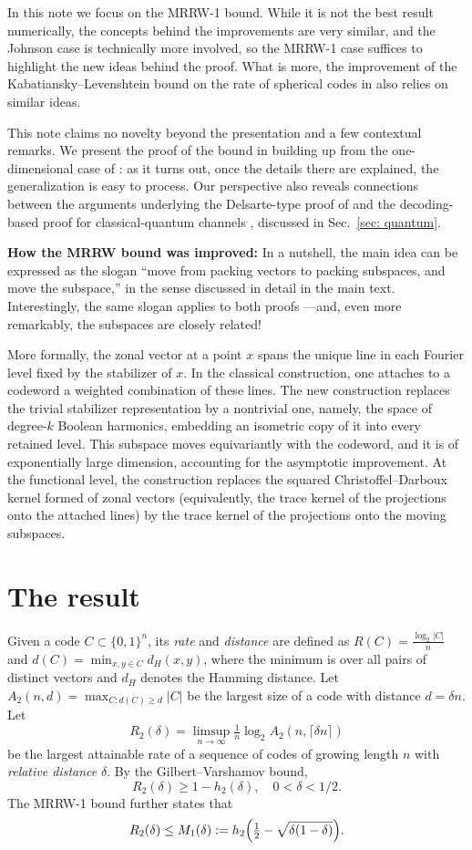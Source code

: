 \documentclass[11pt]{amsart}
\theoremstyle{plain}
\theoremstyle{remark}
\begin{document}
In this note we focus on the MRRW-1 bound. While it is not the best result numerically, the concepts behind the improvements are very similar, and the Johnson case is technically more involved, so the MRRW-1 case suffices to highlight the new ideas behind the proof. What is more, the improvement of the Kabatiansky--Levenshtein bound on the rate of spherical codes in \cite{OAI26} also relies on similar ideas.

This note claims no novelty beyond the presentation and a few contextual remarks. 
We present the proof of the bound in \cite{OAI26} building up from the one-dimensional case of \cite{BN06}: as it turns out, once the details there are explained, the generalization is easy to process. Our perspective also reveals connections between the arguments underlying the Delsarte-type proof of \cite{OAI26} and the decoding-based proof for classical-quantum channels \cite{AG26}, discussed in Sec.~\ref{sec: quantum}.

{\bf How the MRRW bound was improved:} 
 In a nutshell, the main idea can be expressed as the slogan ``move from packing vectors to packing subspaces, and move the subspace,'' in the sense discussed in detail in the main text.
 Interestingly, the same slogan applies to both proofs \cite{OAI26,AG26}---and, even more remarkably, the subspaces are closely related!
 
 More formally, the zonal vector at a point $x$ spans the unique line in each Fourier level fixed by the stabilizer of $x$. In the classical construction, one attaches to a codeword a weighted combination of these lines. The new construction replaces the trivial stabilizer representation by a nontrivial one, namely, the space of degree-$k$ Boolean harmonics, embedding an isometric copy of it into every retained level. This subspace moves equivariantly
 with the codeword, and it is of exponentially large dimension, accounting for the asymptotic improvement. At the functional level, the construction replaces the squared Christoffel–Darboux kernel formed of zonal vectors (equivalently, the trace kernel of the projections onto the attached lines) by the trace kernel of the projections onto the moving subspaces.

 \section{The result}\label{sec:result}

Given a code $C\subset \{0,1\}^n$, its {\em rate} and {\em distance} are defined as $R(C)=\frac{\log_2|C|}{n}$ and $d(C)=\min_{x,y\in C} d_H(x,y)$, where
the minimum is over all pairs of distinct vectors and $d_H$ denotes the Hamming distance. Let $A_2(n,d)=\max_{C:d(C)\ge d}|C|$ be the largest size of a code with distance $d=\delta n$. Let
   $$
 R_2(\delta)=\limsup_{n\to\infty}\tfrac1n\log_2A_2(n,\lceil\delta n\rceil)
   $$
be the largest attainable rate of a sequence of codes of growing length $n$ with {\em relative distance} $\delta$.
By the Gilbert--Varshamov bound,
   $$
   R_2(\delta)\ge 1-h_2(\delta), \quad 0<\delta<1/2.
   $$
The MRRW-1 bound further states that
   $$
   R_2(\delta)\le M_1(\delta):=h_2\Bigl(\tfrac12-\sqrt{\delta(1-\delta)}\Bigr).  
   $$
\end{document}
